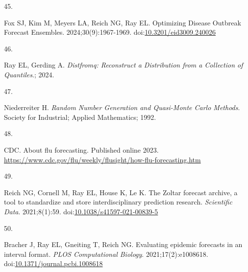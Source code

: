 \documentclass[
  letterpaper,
  DIV=11,
  numbers=noendperiod]{scrartcl}
\newlength{\cslhangindent}
\newlength{\csllabelwidth}
\newenvironment{CSLReferences}[2] %
 {\begin{list}{}{%
  \setlength{\itemindent}{0pt}
  \setlength{\leftmargin}{0pt}
  \setlength{\parsep}{0pt}
  \ifodd #1
   \setlength{\leftmargin}{\cslhangindent}
   \setlength{\itemindent}{-1\cslhangindent}
  \fi
  \setlength{\itemsep}{#2\baselineskip}}}
 {\end{list}}
\newcommand{\CSLLeftMargin}[1]{\parbox[t]{\csllabelwidth}{\strut#1\strut}}
\newcommand{\CSLRightInline}[1]{\parbox[t]{\linewidth - \csllabelwidth}{\strut#1\strut}}
\begin{document}
\begin{CSLReferences}{0}{1}
\CSLLeftMargin{45. }%
\CSLRightInline{Fox SJ, Kim M, Meyers LA, Reich NG, Ray EL. Optimizing
{Disease} {Outbreak} {Forecast} {Ensembles}. 2024;30(9):1967-1969.
doi:\href{https://doi.org/10.3201/eid3009.240026}{10.3201/eid3009.240026}}

\CSLLeftMargin{46. }%
\CSLRightInline{Ray EL, Gerding A. \emph{Distfromq: Reconstruct a
Distribution from a Collection of Quantiles}.; 2024.}

\CSLLeftMargin{47. }%
\CSLRightInline{Niederreiter H. \emph{Random Number Generation and
Quasi-Monte Carlo Methods}. Society for Industrial; Applied Mathematics;
1992.}

\CSLLeftMargin{48. }%
\CSLRightInline{CDC. About flu forecasting. Published online 2023.
\url{https://www.cdc.gov/flu/weekly/flusight/how-flu-forecasting.htm}}

\CSLLeftMargin{49. }%
\CSLRightInline{Reich NG, Cornell M, Ray EL, House K, Le K. The {Zoltar}
forecast archive, a tool to standardize and store interdisciplinary
prediction research. \emph{Scientific Data}. 2021;8(1):59.
doi:\href{https://doi.org/10.1038/s41597-021-00839-5}{10.1038/s41597-021-00839-5}}

\CSLLeftMargin{50. }%
\CSLRightInline{Bracher J, Ray EL, Gneiting T, Reich NG. Evaluating
epidemic forecasts in an interval format. \emph{PLOS Computational
Biology}. 2021;17(2):e1008618.
doi:\href{https://doi.org/10.1371/journal.pcbi.1008618}{10.1371/journal.pcbi.1008618}}

\end{CSLReferences}
\end{document}
